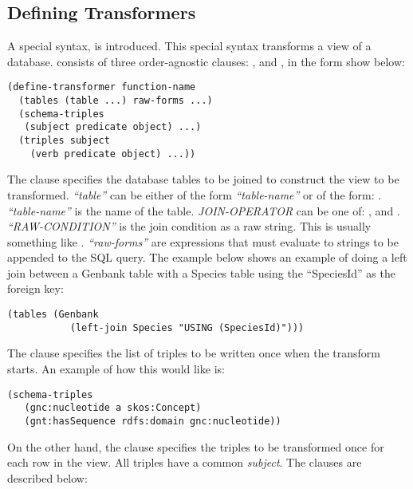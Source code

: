 \subsection{Defining Transformers}

A special syntax,  is introduced.  This special syntax transforms a view of a database.   consists of three order-agnostic clauses: ,  and , in the form show below:

\begin{Verbatim}[frame=single]
(define-transformer function-name
  (tables (table ...) raw-forms ...)
  (schema-triples
   (subject predicate object) ...)
  (triples subject
    (verb predicate object) ...))
\end{Verbatim}

The  clause specifies the database tables to be joined to construct the view to be transformed.  \textit{``table''} can be either of the form \textit{``table-name''} or of the form: .  \textit{``table-name''} is the name of the table.  \textit{JOIN-OPERATOR} can be one of: ,  and .  \textit{``RAW-CONDITION''} is the join condition as a raw string.  This is usually something like .  \textit{``raw-forms''} are expressions that must evaluate to strings to be appended to the SQL query.  The example below shows an example of doing a left join between a Genbank table with a Species table using the ``SpeciesId'' as the foreign key:

\begin{Verbatim}[frame=single]
(tables (Genbank
           (left-join Species "USING (SpeciesId)")))
\end{Verbatim}

The  clause specifies the list of triples to be written once when the transform starts.  An example of how this would like is:

\begin{Verbatim}[frame=single]
(schema-triples
   (gnc:nucleotide a skos:Concept)
   (gnt:hasSequence rdfs:domain gnc:nucleotide))
\end{Verbatim}

On the other hand, the  clause specifies the triples to be transformed once for each row in the view.  All triples have a common \textit{subject}.  The  clauses are described below:

